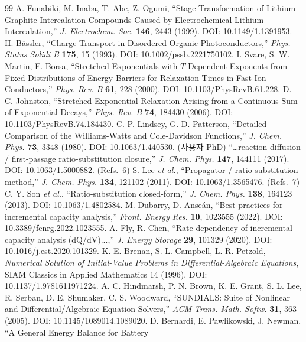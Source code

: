 \documentclass[11pt,a4paper]{article}
\newcommand{\brk}{\discretionary{}{}{}}%
\begin{document}
\begin{thebibliography}{99}
 A. Funabiki, M. Inaba, T. Abe, Z. Ogumi, ``Stage Transformation of
  Lithium-Graphite Intercalation Compounds Caused by Electrochemical Lithium Intercalation,''
  \emph{J. Electrochem. Soc.} \textbf{146}, 2443 (1999). DOI: 10.1149/1.1391953.
 H. B\"assler, ``Charge Transport in Disordered Organic Photoconductors,''
  \emph{Phys. Status Solidi B} \textbf{175}, 15 (1993). DOI: 10.1002/pssb.2221750102.
 I. Svare, S. W. Martin, F. Borsa, ``Stretched Exponentials with $T$-Dependent
  Exponents from Fixed Distributions of Energy Barriers for Relaxation Times in Fast-Ion Conductors,''
  \emph{Phys. Rev. B} \textbf{61}, 228 (2000). DOI: 10.1103/PhysRevB.61.228.
 D. C. Johnston, ``Stretched Exponential Relaxation Arising from a Continuous Sum
  of Exponential Decays,'' \emph{Phys. Rev. B} \textbf{74}, 184430 (2006). DOI: 10.1103/PhysRevB.74.184430.
 C. P. Lindsey, G. D. Patterson, ``Detailed Comparison of the Williams-Watts and
  Cole-Davidson Functions,'' \emph{J. Chem. Phys.} \textbf{73}, 3348 (1980). DOI: 10.1063/1.440530.
 (사용자 PhD) ``\dots reaction-diffusion / first-passage ratio-substitution closure,''
  \emph{J. Chem. Phys.} \textbf{147}, 144111 (2017). DOI: 10.1063/1.5000882.
 (Refs.~6) S. Lee \emph{et al.}, ``Propagator / ratio-substitution method,''
  \emph{J. Chem. Phys.} \textbf{134}, 121102 (2011). DOI: 10.1063/1.3565476.
 (Refs.~7) C. Y. Son \emph{et al.}, ``Ratio-substitution closed-form,''
  \emph{J. Chem. Phys.} \textbf{138}, 164123 (2013). DOI: 10.1063/1.4802584.
 M. Dubarry, D. Anseán, ``Best practices for incremental capacity analysis,''
  \emph{Front. Energy Res.} \textbf{10}, 1023555 (2022). DOI: 10.3389/fenrg.2022.1023555.
 A. Fly, R. Chen, ``Rate dependency of incremental capacity analysis (dQ/dV)...,''
  \emph{J. Energy Storage} \textbf{29}, 101329 (2020). DOI: 10.1016/j.est.2020.101329.
 K. E. Brenan, S. L. Campbell, L. R. Petzold, \emph{Numerical Solution of Initial-Value
  Problems in Differential-Algebraic Equations}, SIAM Classics in Applied Mathematics 14 (1996).
  DOI: 10.1137/\brk 1.9781611971224.
 A. C. Hindmarsh, P. N. Brown, K. E. Grant, S. L. Lee, R. Serban, D. E. Shumaker,
  C. S. Woodward, ``SUNDIALS: Suite of Nonlinear and Differential/Algebraic Equation Solvers,''
  \emph{ACM Trans. Math. Softw.} \textbf{31}, 363 (2005). DOI: 10.1145/\brk 1089014.1089020.
 D. Bernardi, E. Pawlikowski, J. Newman, ``A General Energy Balance for Battery

\end{thebibliography}
\end{document}

